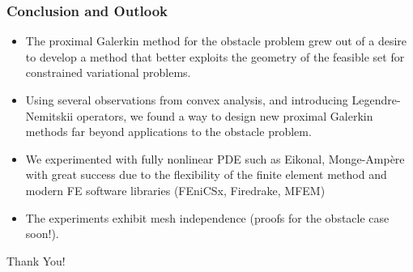 \documentclass[aspectratio=169,xcolor=dvipsnames,11pt]{beamer}
\begin{document}



\begin{frame}\frametitle{Conclusion and Outlook}
\begin{itemize}
\item The proximal Galerkin method for the obstacle problem grew out of a desire to develop a method that better exploits the geometry of the feasible set for constrained variational problems.
\item \pause Using several observations from convex analysis, and introducing Legendre-Nemitskii operators, we found a way to design new proximal Galerkin methods far beyond applications to the obstacle problem.
\item \pause We experimented with fully nonlinear PDE such as Eikonal, Monge-Amp\`ere with great success due to the flexibility of the finite element method and modern FE software libraries (FEniCSx, Firedrake, MFEM)
\item \pause The experiments exhibit mesh independence (proofs for the obstacle case soon!).
\end{itemize}
\begin{center}
\Huge Thank You!
\end{center}
\end{frame}
\end{document}
